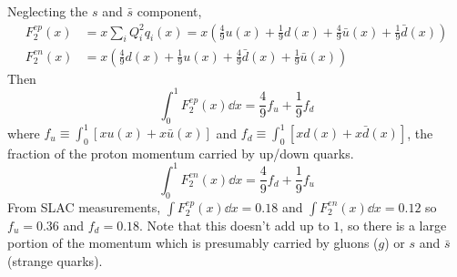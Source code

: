 \documentclass[a4paper,twoside,master.tex]{subfiles}
\begin{document}
Neglecting the $ s $ and $ \bar{s} $ component,
\begin{align}
    F_2^{ep}(x) &= x \sum_i Q_i^2 q_i(x) = x \left( \frac{4}{9} u(x) + \frac{1}{9} d(x) + \frac{4}{9} \bar{u}(x) + \frac{1}{9} \bar{d}(x) \right) \\
    F_2^{en}(x) &= x \left( \frac{4}{9} d(x) + \frac{1}{9} u(x) + \frac{4}{9} \bar{d}(x) + \frac{1}{9} \bar{u}(x) \right)
\end{align}
Then
\begin{equation}
    \int_0^1 F_2^{ep}(x) \dd{x} = \frac{4}{9} f_u + \frac{1}{9} f_d
\end{equation}
where $ f_u \equiv \int_0^1 [x u(x) + x \bar{u}(x)] $ and $ f_d \equiv \int_0^1 [x d(x) + x \bar{d}(x)] $, the fraction of the proton momentum carried by up/down quarks.
\begin{equation}
    \int_0^1 F_2^{en}(x) \dd{x} = \frac{4}{9} f_d + \frac{1}{9} f_u
\end{equation}
From SLAC measurements, $ \int F_2^{ep}(x) \dd{x} = 0.18 $ and $ \int F_2^{en}(x) \dd{x} = 0.12 $ so $ f_u = 0.36 $ and $ f_d = 0.18 $. Note that this doesn't add up to $ 1 $, so there is a large portion of the momentum which is presumably carried by gluons ($ g $) or $ s $ and $ \bar{s} $ (strange quarks).
\end{document}
